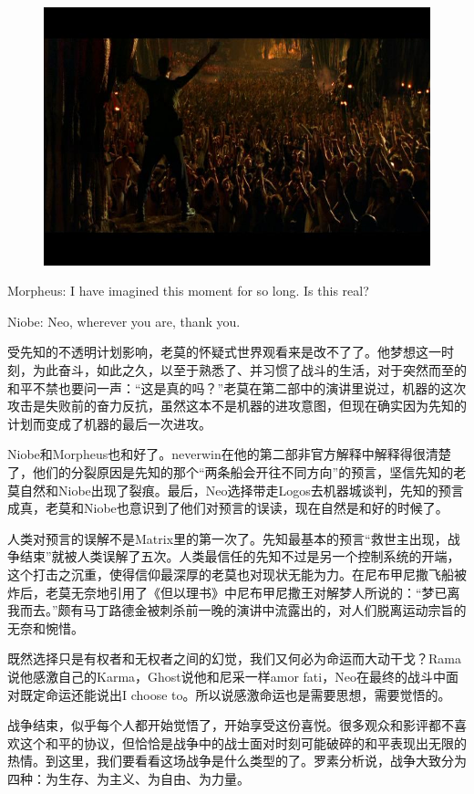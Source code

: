\documentclass[UTF8]{ctexart}
\newenvironment{myquote}{\color{green} \setlength{\leftskip}{6em} \setlength{\rightskip}{4em} \setlength{\parindent}{-2em}}{\par}
\begin{document}
\begin{figure}[htb]
\centering
\includegraphics[width=0.5\linewidth]{fig/187200e96cd6ba3bb90e2d5a.jpg}
\end{figure}

\begin{myquote}
Morpheus: I have imagined this moment for so long. Is this real?

Niobe: Neo, wherever you are, thank you.
\end{myquote}

受先知的不透明计划影响，老莫的怀疑式世界观看来是改不了了。他梦想这一时刻，为此奋斗，如此之久，以至于熟悉了、并习惯了战斗的生活，对于突然而至的和平不禁也要问一声：“这是真的吗？”老莫在第二部中的演讲里说过，机器的这次攻击是失败前的奋力反抗，虽然这本不是机器的进攻意图，但现在确实因为先知的计划而变成了机器的最后一次进攻。

Niobe和Morpheus也和好了。neverwin在他的第二部非官方解释中解释得很清楚了，他们的分裂原因是先知的那个“两条船会开往不同方向”的预言，坚信先知的老莫自然和Niobe出现了裂痕。最后，Neo选择带走Logos去机器城谈判，先知的预言成真，老莫和Niobe也意识到了他们对预言的误读，现在自然是和好的时候了。

人类对预言的误解不是Matrix里的第一次了。先知最基本的预言“救世主出现，战争结束”就被人类误解了五次。人类最信任的先知不过是另一个控制系统的开端，这个打击之沉重，使得信仰最深厚的老莫也对现状无能为力。在尼布甲尼撒飞船被炸后，老莫无奈地引用了《但以理书》中尼布甲尼撒王对解梦人所说的：“梦已离我而去。”颇有马丁路德金被刺杀前一晚的演讲中流露出的，对人们脱离运动宗旨的无奈和惋惜。

既然选择只是有权者和无权者之间的幻觉，我们又何必为命运而大动干戈？Rama说他感激自己的Karma，Ghost说他和尼采一样amor fati，Neo在最终的战斗中面对既定命运还能说出I choose to。所以说感激命运也是需要思想，需要觉悟的。

战争结束，似乎每个人都开始觉悟了，开始享受这份喜悦。很多观众和影评都不喜欢这个和平的协议，但恰恰是战争中的战士面对时刻可能破碎的和平表现出无限的热情。到这里，我们要看看这场战争是什么类型的了。罗素分析说，战争大致分为四种：为生存、为主义、为自由、为力量。
\end{document}
